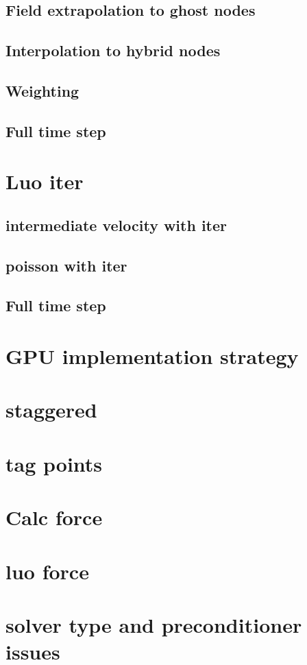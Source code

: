 \documentclass[onehalf,11pt]{beavtex}
\begin{document}
\subsection{Field extrapolation to ghost nodes}
\subsection{Interpolation to hybrid nodes}
\subsection{Weighting}
\subsection{Full time step}
\section{Luo iter}
\subsection{intermediate velocity with iter}
\subsection{poisson with iter}
\subsection{Full time step}
\section{GPU implementation strategy}
\section{staggered}
\section{tag points}
\section{Calc force}
\section{luo force}
\section{solver type and preconditioner issues}
\end{document}
